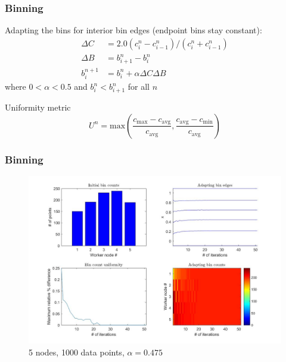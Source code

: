 \documentclass{beamer}
\begin{document}
\begin{frame}
	\frametitle{Binning}
	
	\begin{block}{Adapting the bins}
		for interior bin edges (endpoint bins stay constant):
		\begin{equation}
			\begin{split}
				\Delta C & = 2.0 ( c_i^n - c_{i-1}^n ) / ( c_i^n + c_{i-1}^n ) \\
				\Delta B & = b_{i+1}^n - b_i^n \\
				b_i^{n+1} & = b_i^n + \alpha \Delta C \Delta B
			\end{split}
		\end{equation}
		where $0 < \alpha < 0.5$ and $b_i^n < b_{i+1}^n$ for all $n$
	\end{block}
	
	\begin{block}{Uniformity metric}
		\begin{equation}
			U^n = \textrm{max}( \dfrac{c_{\textrm{max}} - c_{\textrm{avg}}}{c_{\textrm{avg}}}, \dfrac{c_{\textrm{avg}} - c_{\textrm{min}}}{c_{\textrm{avg}}} )
		\end{equation}
	\end{block}
\end{frame}

\begin{frame}
	\frametitle{Binning}
	
	\begin{figure}[!htb]
		\centering
		\vspace{-5pt}
		\includegraphics[scale = 0.25]{AdaptiveBinning_5Nodes_1000Lines_0475alpha}
		\vspace{-10pt}
		\caption{5 nodes, 1000 data points, $\alpha = 0.475$}
	\end{figure}
\end{frame}
\end{document}
